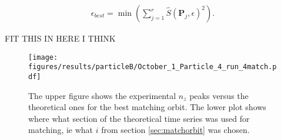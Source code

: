 \begin{eqnarray}
\epsilon_{best} = \min(\sum\limits_{j=1}^{r} \hat{S}(\mathbf{P}_j, \epsilon)^2).
\end{eqnarray}

FIT THIS IN HERE I THINK 

\begin{figure}[H]
\centering
\texttt{[image: figures/results/particleB/October\_1\_Particle\_4\_run\_4match.pdf]}
\caption{The upper figure shows the experimental $n_z$ peaks versus the theoretical ones for the best matching orbit. The lower plot shows where what section of the theoretical time series was used for matching, ie what $i$ from section \ref{sec:matchorbit} was chosen.}
\label{fig:particleB2match}
\end{figure}


